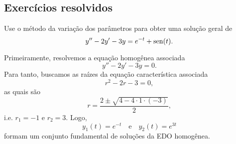 \subsection*{Exercícios resolvidos}

\begin{exeresol}\label{exeresol:ed2o_nh_vp}
  Use o método da variação dos parâmetros para obter uma solução geral de
  \begin{equation}
    y'' - 2y' - 3y = e^{-t}+\operatorname{sen}(t).
  \end{equation}
\end{exeresol}
\begin{resol}
  Primeiramente, resolvemos a equação homogênea associada
  \begin{equation}
    y'' - 2y' - 3y = 0.
  \end{equation}
  Para tanto, buscamos as raízes da equação característica associada
  \begin{equation}
    r^2 - 2r - 3 = 0,
  \end{equation}
  as quais são
  \begin{equation}
    r = \frac{2 \pm \sqrt{4 - 4\cdot 1\cdot (-3)}}{2},
  \end{equation}
  i.e. $r_1 = -1$ e $r_2 = 3$. Logo,
  \begin{equation}
    y_1(t) = e^{-t}\quad\text{e}\quad y_2(t) = e^{3t}
  \end{equation}
  formam um conjunto fundamental de soluções da EDO homogênea.


\end{resol}
